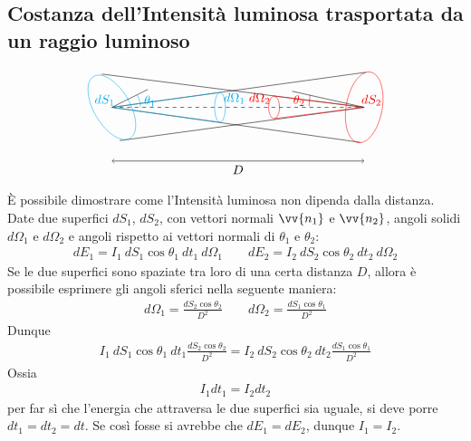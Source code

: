 \documentclass[a4paper, oneside]{book}
\begin{document}
\subsection{Costanza dell'Intensità luminosa trasportata da un raggio luminoso}
\begin{gather*}
    \begin{tikzpicture}
        \draw[dashed, thin](0, 0) -- (7, 0);
        \draw[thin](-0.28, 0.93) -- (7, 0);
        \draw[thin](0.22, -0.93) -- (7, 0);
        \draw[thin](0, 0) -- (7.05, 0.98);
        \draw[thin](0, 0)-- (6.9, -0.98);
        \draw[<->](0, -1.5) -- (7, -1.5) node[midway, below] {$D$};
        \draw[rotate around={30:(0, 0)}, cyan] (0, 0) ellipse (0.5 and 1);
        \draw[rotate around={-10:(7, 0)}, red] (7, 0) ellipse (0.5 and 1);
        \draw(0, 0) -- (1, 0.5);
        \draw(7, 0) -- (5, 0.45);
        \draw[cyan](3, 0) ellipse (0.15 and 0.415);
        \draw[red](4.5, 0) ellipse (0.15 and 0.315);
        \draw[cyan](3, 0.415) -- (0, 0) -- (3, -0.415);
        \draw[red](4.5, 0.315) -- (7, 0) -- (4.5, -0.315);
        \node[cyan] at (-0.2, 0.2) {$dS_1$};
        \node[red] at (7.2, 0.2) {$dS_2$};
        \node[cyan] at (3.4, 0.25) {$d\Omega_1$};
        \node[red] at (4.1, 0.25) {$d\Omega_2$};
        \draw[cyan](0.7, 0.35) arc (30:0:0.7) node[midway, right] {$\theta_1$};
        \draw[red](5.5, 0.35) arc (170:180:1.85) node[midway, left] {$\theta_2$};
    \end{tikzpicture}    
\end{gather*}
È possibile dimostrare come l'Intensità luminosa non dipenda dalla distanza.
Date due superfici $dS_1$, $dS_2$, con vettori normali $\vv{n_1}$ e $\vv{n_2}$, angoli solidi
$d\Omega_1$ e $d\Omega_2$ e angoli rispetto ai vettori normali di $\theta_1$ e $\theta_2$:
\begin{gather*}
    dE_1 = I_1 \ dS_1 \cos\theta_1 \ dt_1 \ d\Omega_1 \qquad dE_2 = I_2 \ dS_2 \cos\theta_2 \ dt_2 \ d\Omega_2 
\end{gather*}
Se le due superfici sono spaziate tra loro di una certa distanza $D$, allora è possibile
esprimere gli angoli sferici nella seguente maniera: 
\begin{gather*}
    d\Omega_1 = \frac{dS_2\cos\theta_2}{D^{2}} \qquad d\Omega_2 = \frac{dS_1 \cos\theta_1}{D^{2}}
\end{gather*}
Dunque
\begin{gather*}
    I_1 \ dS_1\cos\theta_1 \ dt_1 \frac{dS_2 \cos\theta_2}{D^{2}} = I_2 \ dS_2 \cos\theta_2\ dt_2 \frac{dS_1\cos\theta_1}{D^{2}}
\end{gather*}
Ossia
\begin{gather*}
    I_1 dt_1 = I_2 dt_2
\end{gather*}
per far sì che l'energia che attraversa le due superfici sia uguale, si deve porre $dt_1 = dt_2 = dt$. 
Se così fosse si avrebbe che $dE_1 = dE_2$, dunque $I_1 = I_2$. 
\end{document}
